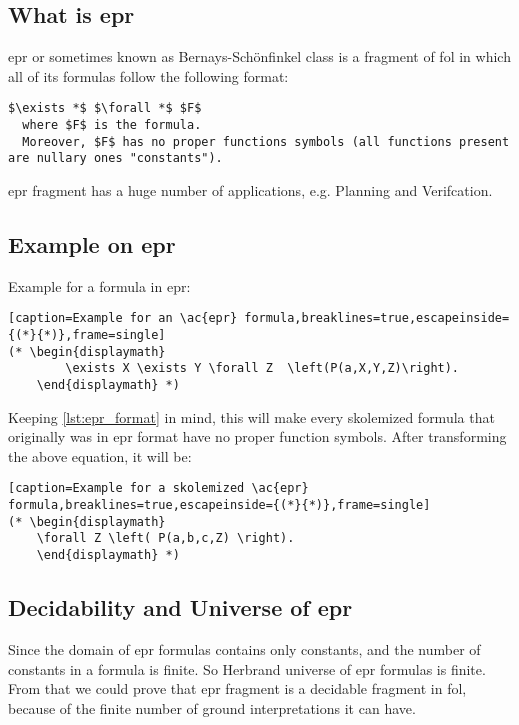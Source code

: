 \subsection{What is \ac{epr}}\label{sub:c2s2s1}
\acf{epr} or sometimes known as Bernays-Sch\"onfinkel class is a fragment of \acf{fol} in which all of its formulas follow the following format:

\begin{lstlisting}[caption=Format of \ac{epr} formula,label={lst:epr_format},breaklines=true,mathescape,frame=single]
                          $\exists *$ $\forall *$ $F$
  where $F$ is the formula.
  Moreover, $F$ has no proper functions symbols (all functions present are nullary ones "constants").
\end{lstlisting}

\ac{epr} fragment has a huge number of applications, e.g. Planning and Verifcation. 


\subsection{Example on \ac{epr}}\label{sub:c2s2s2}
Example for a formula in \ac{epr}:

\begin{lstlisting}[caption=Example for an \ac{epr} formula,breaklines=true,escapeinside={(*}{*)},frame=single]
(* \begin{displaymath}
		\exists X \exists Y \forall Z  \left(P(a,X,Y,Z)\right).
	\end{displaymath} *)
\end{lstlisting}


Keeping \ref{lst:epr_format} in mind, this will make every skolemized formula that originally was in \ac{epr} format have no proper function symbols. After transforming the above equation, it will be:

\begin{lstlisting}[caption=Example for a skolemized \ac{epr} formula,breaklines=true,escapeinside={(*}{*)},frame=single]
(* \begin{displaymath}
	\forall Z \left( P(a,b,c,Z) \right).
	\end{displaymath} *)
\end{lstlisting}



\subsection{Decidability and Universe of \ac{epr}}\label{sub:c2s2s3}
Since the domain of \ac{epr} formulas contains only constants, and the number of constants in a formula is finite. So Herbrand universe of \ac{epr} formulas is finite. From that we could prove that \ac{epr} fragment is a decidable fragment in \ac{fol}, because of the finite number of ground interpretations it can have.


